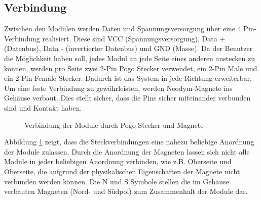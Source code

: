 \subsection{Verbindung}
Zwischen den Modulen werden Daten und Spannungsversorgung über eine 4 Pin-Verbindung realisiert. Diese sind VCC (Spannungsversorgung), Data + (Datenbus), Data - (invertierter Datenbus) und GND (Masse). Da der Benutzer die Möglichkeit haben soll, jedes Modul an jede Seite eines anderen anstecken zu können, werden pro Seite zwei 2-Pin Pogo Stecker verwendet, ein 2-Pin Male und ein 2-Pin Female Stecker. Dadurch ist das System in jede Richtung erweiterbar. Um eine feste Verbindung zu gewährleisten,  werden Neodym-Magnete ins Gehäuse verbaut. Dies stellt sicher, dass die Pins sicher miteinander verbunden sind und Kontakt haben. 
\begin{figure}[H]
    \centering    
    \caption{Verbindung der Module durch Pogo-Stecker und Magnete}
    \label{pogo_verbindung}
\end{figure}
 \noindent Abbildung \ref{pogo_verbindung} zeigt, dass die Steckverbindungen eine nahezu beliebige Anordnung der Module zulassen. Durch die Anordnung der Magneten lassen sich nicht alle Module in jeder beliebigen Anordnung verbinden, wie z.B. Oberseite und Oberseite, die aufgrund der physikalischen Eigenschaften der Magnete nicht verbunden werden können. Die \glqq N\grqq{} und \glqq S\grqq{} Symbole stellen die im Gehäuse verbauten Magneten (Nord- und Südpol) zum Zusammenhalt der Module dar.
 
